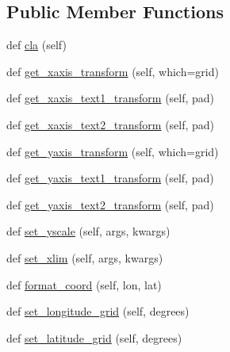 \subsection*{Public Member Functions}
\begin{DoxyCompactItemize}
\item 
def \hyperlink{classmatplotlib_1_1projections_1_1geo_1_1GeoAxes_a96b4ecbdd2d29be9794481558170b549}{cla} (self)
\item 
def \hyperlink{classmatplotlib_1_1projections_1_1geo_1_1GeoAxes_aae9be0965b9eab4a3a81d47450b3d4a1}{get\+\_\+xaxis\+\_\+transform} (self, which=\textquotesingle{}grid\textquotesingle{})
\item 
def \hyperlink{classmatplotlib_1_1projections_1_1geo_1_1GeoAxes_a2ff3a557489f9a171fc78b241985c8dc}{get\+\_\+xaxis\+\_\+text1\+\_\+transform} (self, pad)
\item 
def \hyperlink{classmatplotlib_1_1projections_1_1geo_1_1GeoAxes_a61b7ae47c15c8083dbb74206dcadc688}{get\+\_\+xaxis\+\_\+text2\+\_\+transform} (self, pad)
\item 
def \hyperlink{classmatplotlib_1_1projections_1_1geo_1_1GeoAxes_a6d4ef202cb6e91671ab2b1b4bf81686a}{get\+\_\+yaxis\+\_\+transform} (self, which=\textquotesingle{}grid\textquotesingle{})
\item 
def \hyperlink{classmatplotlib_1_1projections_1_1geo_1_1GeoAxes_aeb18801b55de4af9171a9012969148a4}{get\+\_\+yaxis\+\_\+text1\+\_\+transform} (self, pad)
\item 
def \hyperlink{classmatplotlib_1_1projections_1_1geo_1_1GeoAxes_ae5af9b7daf3e6a1b3823f352bff5582c}{get\+\_\+yaxis\+\_\+text2\+\_\+transform} (self, pad)
\item 
def \hyperlink{classmatplotlib_1_1projections_1_1geo_1_1GeoAxes_a1d71beb234e72df5ef6d95be688db701}{set\+\_\+yscale} (self, args, kwargs)
\item 
def \hyperlink{classmatplotlib_1_1projections_1_1geo_1_1GeoAxes_a264645db9ad75b509765f18fb408e563}{set\+\_\+xlim} (self, args, kwargs)
\item 
def \hyperlink{classmatplotlib_1_1projections_1_1geo_1_1GeoAxes_aa3cff7b89f8d80f2bf104bb1b343c9bf}{format\+\_\+coord} (self, lon, lat)
\item 
def \hyperlink{classmatplotlib_1_1projections_1_1geo_1_1GeoAxes_ac7ff8c88c8e044de002f1eae90c99d8e}{set\+\_\+longitude\+\_\+grid} (self, degrees)
\item 
def \hyperlink{classmatplotlib_1_1projections_1_1geo_1_1GeoAxes_a9f232e81be69896e9c63adc5b20999cc}{set\+\_\+latitude\+\_\+grid} (self, degrees)

\end{DoxyCompactItemize}
